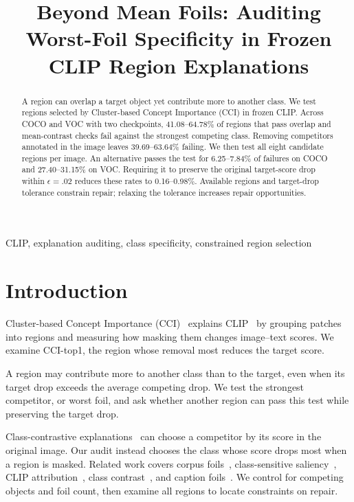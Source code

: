 \documentclass[10pt]{article}
\title{Beyond Mean Foils: Auditing Worst-Foil Specificity in Frozen CLIP Region Explanations}
\begin{document}
\maketitle
\begin{abstract}
A region can overlap a target object yet contribute more to another class.
We test regions selected by Cluster-based Concept Importance (CCI) in frozen CLIP. Across COCO and VOC with two
checkpoints, 41.08--64.78\% of regions that pass overlap and mean-contrast
checks fail against the strongest competing class. Removing competitors
annotated in the image leaves 39.69--63.64\% failing. We then test all eight candidate regions per image. An alternative passes the test for 6.25--7.84\% of failures on
COCO and 27.40--31.15\% on VOC. Requiring it to preserve the original
target-score drop within $\epsilon=.02$ reduces these rates to 0.16--0.98\%.
Available regions and target-drop tolerance constrain repair; relaxing
the tolerance increases repair opportunities.

\end{abstract}
\begin{keywords}
CLIP, explanation auditing, class specificity, constrained region selection
\end{keywords}

\section{Introduction}
Cluster-based Concept Importance (CCI)~\cite{agarwal2025cci} explains
CLIP~\cite{radford2021clip} by grouping patches into regions and measuring
how masking them changes image--text scores. We examine CCI-top1, the
region whose removal most reduces the target score.

A region may contribute more to another class than to the target, even
when its target drop exceeds the average competing drop. We test the
strongest competitor, or worst foil, and ask whether another region can
pass this test while preserving the target drop.

Class-contrastive explanations~\cite{wang2022whynot} can choose a
competitor by its score in the original image. Our audit instead chooses
the class whose score drops most when a region is masked.
Related work covers corpus foils~\cite{lin2023cocoa}, class-sensitive
saliency~\cite{williamson2025case}, CLIP
attribution~\cite{wang2023m2ib,li2023clipsurgery,dreyer2025cliplatent},
class contrast~\cite{li2026cdaclip}, and caption foils~\cite{yuksekgonul2023aro}.
We control for competing objects and foil count, then examine all regions
to locate constraints on repair.
\end{document}
